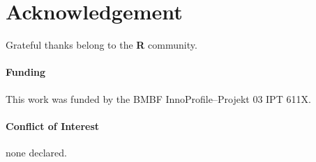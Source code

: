 \documentclass{bioinfo}
\begin{document}
\section*{Acknowledgement}
Grateful thanks belong to the \textbf{R} community.

\paragraph{Funding\textcolon} This work was funded by the BMBF InnoProfile--Projekt 03 IPT 611X.

\paragraph{Conflict of Interest\textcolon} none declared.



%
%
%
%
%
%
%

\end{document}

